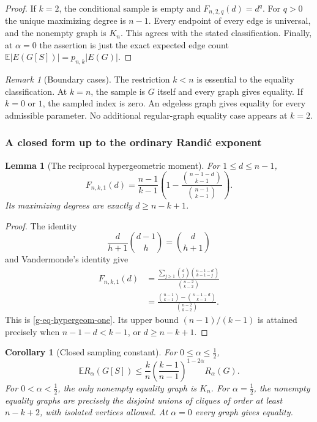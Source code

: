 \documentclass[11pt,a4paper]{article}
\newtheorem{lemma}[theorem]{Lemma}
\newtheorem{corollary}[theorem]{Corollary}
\theoremstyle{definition}
\theoremstyle{remark}
\newtheorem{remark}[theorem]{Remark}
\begin{document}
\begin{proof}
If $k=2$, the conditional sample is empty and $F_{n,2,q}(d)=d^q$.
For $q>0$ the unique maximizing degree is $n-1$.  Every endpoint of every
edge is universal, and the nonempty graph is $K_n$.  This agrees with
the stated classification.  Finally, at $\alpha=0$ the assertion is just
the exact expected edge count $\mathbb E|E(G[S])|=p_{n,k}|E(G)|$.
\end{proof}

\begin{remark}[Boundary cases]
The restriction $k<n$ is essential to the equality classification.
At $k=n$, the sample is $G$ itself and every graph gives equality.  If
$k=0$ or $1$, the sampled index is zero.  An edgeless graph gives equality
for every admissible parameter.  No additional regular-graph equality
case appears at $k=2$.
\end{remark}

\subsubsection{A closed form up to the ordinary Randi\'c exponent}

\begin{lemma}[The reciprocal hypergeometric moment]
\label{g-lem-hypergeom-one}
For $1\le d\le n-1$,
\begin{equation}
 F_{n,k,1}(d)=\frac{n-1}{k-1}
 \left(1-
 \frac{\binom{n-1-d}{k-1}}{\binom{n-1}{k-1}}\right).
 \label{g-eq-hypergeom-one}
\end{equation}
Its maximizing degrees are exactly $d\ge n-k+1$.
\end{lemma}

\begin{proof}
The identity
\[
 \frac d{h+1}\binom{d-1}{h}=\binom d{h+1}
\]
and Vandermonde's identity give
\begin{align*}
 F_{n,k,1}(d)
 &=\frac{\sum_{j\ge1}\binom d j
                   \binom{n-1-d}{k-1-j}}
          {\binom{n-2}{k-2}}\\
 &=\frac{\binom{n-1}{k-1}-\binom{n-1-d}{k-1}}
          {\binom{n-2}{k-2}}.
\end{align*}
This is \eqref{g-eq-hypergeom-one}.  Its upper bound $(n-1)/(k-1)$
is attained precisely when $n-1-d<k-1$, or $d\ge n-k+1$.
\end{proof}

\begin{corollary}[Closed sampling constant]
\label{g-cor-closed-sampling}
For $0\le\alpha\le\tfrac12$,
\begin{equation}
 \mathbb E R_\alpha(G[S])
 \le \frac{k}{n}
       \left(\frac{k-1}{n-1}\right)^{1-2\alpha}R_\alpha(G).
 \label{g-eq-closed-sampling}
\end{equation}
For $0<\alpha<\tfrac12$, the only nonempty equality graph is $K_n$.
For $\alpha=\tfrac12$, the nonempty equality graphs are precisely the
disjoint unions of cliques of order at least $n-k+2$, with isolated
vertices allowed.  At $\alpha=0$ every graph gives equality.
\end{corollary}
\end{document}
